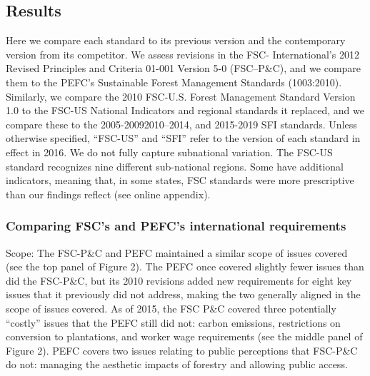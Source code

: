 \documentclass[
      12pt,
            Review ]{article}
\begin{document}
\subsection{Results}\label{results}

Here we compare each standard to its previous version and the
contemporary version from its competitor. We assess revisions in the
FSC- International's 2012 Revised Principles and Criteria 01-001 Version
5-0 (FSC--P\&C), and we compare them to the PEFC's Sustainable Forest
Management Standards (1003:2010). Similarly, we compare the 2010
FSC-U.S. Forest Management Standard Version 1.0 to the FSC-US National
Indicators and regional standards it replaced, and we compare these to
the 2005-20092010--2014, and 2015-2019 SFI standards. Unless otherwise
specified, ``FSC-US'' and ``SFI'' refer to the version of each standard
in effect in 2016. We do not fully capture subnational variation. The
FSC-US standard recognizes nine different sub-national regions. Some
have additional indicators, meaning that, in some states, FSC standards
were more prescriptive than our findings reflect (see online appendix).

\subsubsection{Comparing FSC's and PEFC's international
requirements}\label{comparing-fscs-and-pefcs-international-requirements}

Scope: The FSC-P\&C and PEFC maintained a similar scope of issues
covered (see the top panel of Figure 2). The PEFC once covered slightly
fewer issues than did the FSC-P\&C, but its 2010 revisions added new
requirements for eight key issues that it previously did not address,
making the two generally aligned in the scope of issues covered. As of
2015, the FSC P\&C covered three potentially ``costly'' issues that the
PEFC still did not: carbon emissions, restrictions on conversion to
plantations, and worker wage requirements (see the middle panel of
Figure 2). PEFC covers two issues relating to public perceptions that
FSC-P\&C do not: managing the aesthetic impacts of forestry and allowing
public access.
\end{document}
